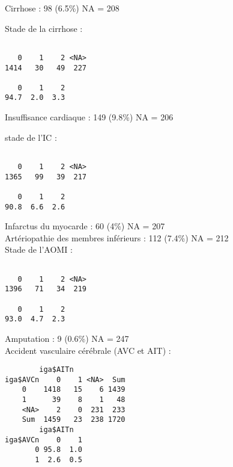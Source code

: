 \documentclass[11pt,a4paper]{article}\usepackage[]{graphicx}\usepackage[]{color}
\makeatletter
\newenvironment{kframe}{%
 \def\at@end@of@kframe{}%
 \ifinner\ifhmode%
  \def\at@end@of@kframe{\end{minipage}}%
  \begin{minipage}{\columnwidth}%
 \fi\fi%
 \def\FrameCommand##1{\hskip\@totalleftmargin \hskip-\fboxsep
 \colorbox{shadecolor}{##1}\hskip-\fboxsep
     \hskip-\linewidth \hskip-\@totalleftmargin \hskip\columnwidth}%
 \MakeFramed {\advance\hsize-\width
   \@totalleftmargin\z@ \linewidth\hsize
   \@setminipage}}%
 {\par\unskip\endMakeFramed%
 \at@end@of@kframe}
\newenvironment{knitrout}{}{} %
\makeatother
\begin{document}
Cirrhose : 98 (6.5\%) NA = 208

Stade de la cirrhose :

\begin{knitrout}
\color{fgcolor}\begin{kframe}
\begin{verbatim}

   0    1    2 <NA> 
1414   30   49  227 

   0    1    2 
94.7  2.0  3.3 
\end{verbatim}
\end{kframe}
\end{knitrout}

Insuffisance cardiaque : 149 (9.8\%) NA = 206

stade de l’IC :

\begin{knitrout}
\color{fgcolor}\begin{kframe}
\begin{verbatim}

   0    1    2 <NA> 
1365   99   39  217 

   0    1    2 
90.8  6.6  2.6 
\end{verbatim}
\end{kframe}
\end{knitrout}

Infarctus du myocarde : 60 (4\%) NA = 207
~\\

Artériopathie des membres inférieurs : 112 (7.4\%) NA = 212
~\\

Stade de l’AOMI : 

\begin{knitrout}
\color{fgcolor}\begin{kframe}
\begin{verbatim}

   0    1    2 <NA> 
1396   71   34  219 

   0    1    2 
93.0  4.7  2.3 
\end{verbatim}
\end{kframe}
\end{knitrout}

Amputation : 9 (0.6\%) NA = 247
~\\

Accident vasculaire cérébrale (AVC et AIT) :

\begin{knitrout}
\color{fgcolor}\begin{kframe}
\begin{verbatim}
        iga$AITn
iga$AVCn    0    1 <NA>  Sum
    0    1418   15    6 1439
    1      39    8    1   48
    <NA>    2    0  231  233
    Sum  1459   23  238 1720
        iga$AITn
iga$AVCn    0    1
       0 95.8  1.0
       1  2.6  0.5
\end{verbatim}
\end{kframe}
\end{knitrout}
\end{document}
